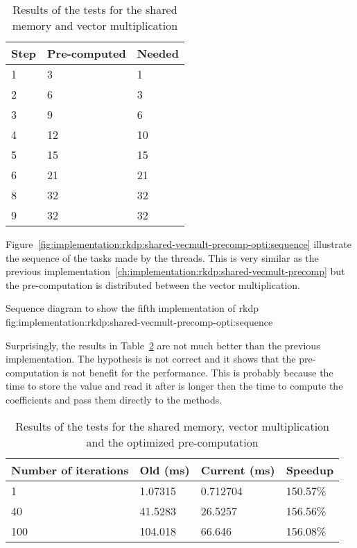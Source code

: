 \begin{table}[ht]
    \centering
    \begin{tabular}{|l|l|l|}
        \hline
        \textbf{Step} & \textbf{Pre-computed} & \textbf{Needed} \\
        \hline
        1 & 3 & 1 \\
        \hline
        2 & 6 & 3 \\
        \hline
        3 & 9 & 6 \\
        \hline
        4 & 12 & 10 \\
        \hline
        5 & 15 & 15 \\
        \hline
        6 & 21 & 21 \\
        \hline
        8 & 32 & 32 \\
        \hline
        9 & 32 & 32 \\
        \hline
    \end{tabular}
    \caption{Results of the tests for the shared memory and vector multiplication}
    \label{tab:implementation:rkdp:shared-vecmult-precomp-opti:coefficients}
\end{table}

Figure~\ref{fig:implementation:rkdp:shared-vecmult-precomp-opti:sequence}
illustrate the sequence of the tasks made by the threads.
This is very similar as the previous implementation~\ref{ch:implementation:rkdp:shared-vecmult-precomp}
but the pre-computation is distributed between the vector multiplication.

{Sequence diagram to show the fifth implementation of \acrshort{rkdp}}
{fig:implementation:rkdp:shared-vecmult-precomp-opti:sequence}

Surprisingly, the results in Table~\ref{tab:implementation:rkdp:shared-vecmult-precomp-opti:results}
are not much better than the previous implementation.
The hypothesis is not correct and it shows that the pre-computation is not
benefit for the performance.
This is probably because the time to store the value and read it after is longer
then the time to compute the coefficients and pass them directly to the methods.

\begin{table}[ht]
    \centering
    \begin{tabular}{|l|l|l|l|}
        \hline
        \textbf{Number of iterations} & \textbf{Old (ms)} & \textbf{Current (ms)} & \textbf{Speedup} \\
        \hline
        1 & 1.07315 & 0.712704 & 150.57\% \\
        \hline
        40 & 41.5283 & 26.5257 & 156.56\% \\
        \hline
        100 & 104.018 & 66.646 & 156.08\% \\
        \hline
    \end{tabular}
    \caption{Results of the tests for the shared memory, vector multiplication and the optimized pre-computation}
    \label{tab:implementation:rkdp:shared-vecmult-precomp-opti:results}
\end{table}

